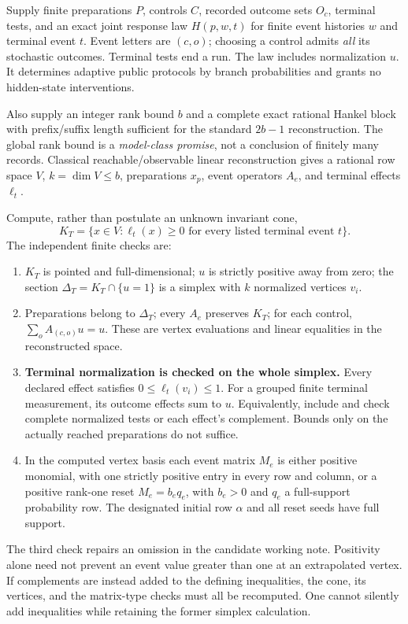 \documentclass[11pt]{article}
\theoremstyle{remark}
\begin{document}
Supply finite preparations $P$, controls $C$, recorded outcome sets $O_c$, terminal tests, and an exact joint response law $H(p,w,t)$ for finite event histories $w$ and terminal event $t$. Event letters are $(c,o)$; choosing a control admits \emph{all} its stochastic outcomes. Terminal tests end a run. The law includes normalization $u$. It determines adaptive public protocols by branch probabilities and grants no hidden-state interventions.

Also supply an integer rank bound $b$ and a complete exact rational Hankel block with prefix/suffix length sufficient for the standard $2b-1$ reconstruction. The global rank bound is a \emph{model-class promise}, not a conclusion of finitely many records. Classical reachable/observable linear reconstruction gives a rational row space $V$, $k=\dim V\leq b$, preparations $x_p$, event operators $A_e$, and terminal effects $\ell_t$.

Compute, rather than postulate an unknown invariant cone,
\[
 K_T=\{x\in V:\ell_t(x)\geq0\text{ for every listed terminal event }t\}.
\]
The independent finite checks are:
\begin{enumerate}
\item $K_T$ is pointed and full-dimensional; $u$ is strictly positive away from zero; the section $\Delta_T=K_T\cap\{u=1\}$ is a simplex with $k$ normalized vertices $v_i$.
\item Preparations belong to $\Delta_T$; every $A_e$ preserves $K_T$; for each control, $\sum_o A_{(c,o)}u=u$. These are vertex evaluations and linear equalities in the reconstructed space.
\item \textbf{Terminal normalization is checked on the whole simplex.} Every declared effect satisfies $0\leq\ell_t(v_i)\leq1$. For a grouped finite terminal measurement, its outcome effects sum to $u$. Equivalently, include and check complete normalized tests or each effect's complement. Bounds only on the actually reached preparations do not suffice.
\item In the computed vertex basis each event matrix $M_e$ is either positive monomial, with one strictly positive entry in every row and column, or a positive rank-one reset $M_e=b_eq_e$, with $b_e>0$ and $q_e$ a full-support probability row. The designated initial row $\alpha$ and all reset seeds have full support.
\end{enumerate}

The third check repairs an omission in the candidate working note. Positivity alone need not prevent an event value greater than one at an extrapolated vertex. If complements are instead added to the defining inequalities, the cone, its vertices, and the matrix-type checks must all be recomputed. One cannot silently add inequalities while retaining the former simplex calculation.
\end{document}

